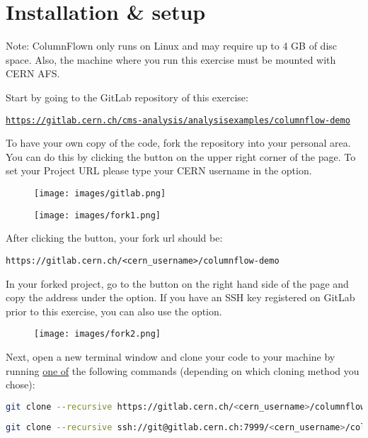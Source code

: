 \section{Installation \& setup}
\justifying
\begin{tcolorbox}[colback=green!5!white,colframe=green!75!black,width=\textwidth]
Note: ColumnFlown only runs on Linux and may require up to 4 GB of disc space. \tcblower
Also, the machine where you run this exercise must be mounted with CERN AFS.
\end{tcolorbox}

Start by going to the GitLab repository of this exercise:

\texttt{\textcolor{LimeGreen}{\href{https://gitlab.cern.ch/cms-analysis/analysisexamples/columnflow-demo}{\underline{https://gitlab.cern.ch/cms-analysis/analysisexamples/columnflow-demo}}}}

To have your own copy of the code, fork the repository into your personal area. You can do this by clicking the  button on the upper right corner of the page. To set your Project URL please type your CERN username in the  option.

\begin{figure}[!h]
    \centering
    \texttt{[image: images/gitlab.png]}
\end{figure}
\begin{figure}[!h]
    \centering
    \texttt{[image: images/fork1.png]}
\end{figure}

After clicking the  button, your fork url should be:

\texttt{https://gitlab.cern.ch/<cern\_username>/columnflow-demo}

\newpage
In your forked project, go to the  button on the right hand side of the page and copy the address under the  option. If you have an SSH key registered on GitLab prior to this exercise, you can also use the  option.

\begin{figure}[!h]
    \centering
    \texttt{[image: images/fork2.png]}
\end{figure}

Next, open a new terminal window and clone your code to your machine by running \underline{one of} the following commands (depending on which cloning method you chose):

\begin{lstlisting}[language=bash]
git clone --recursive https://gitlab.cern.ch/<cern_username>/columnflow-demo.git
\end{lstlisting}
\begin{lstlisting}[language=bash]
git clone --recursive ssh://git@gitlab.cern.ch:7999/<cern_username>/columnflow-demo.git
\end{lstlisting}

